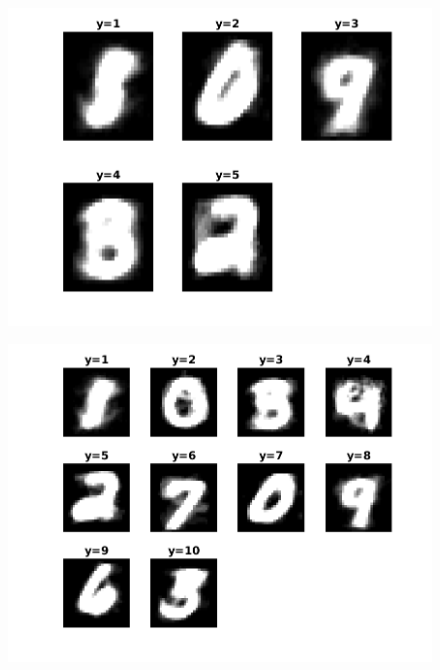 \documentclass{article}
\begin{document}
\begin{figure}[h!]
\begin{multicols}{3}
\includegraphics[width=1\columnwidth]{RunResults2/3.png}
\label{3}

\includegraphics[width=1\columnwidth]{RunResults2/4.png}
\label{4}


\end{multicols}
\end{figure}
\end{document}
